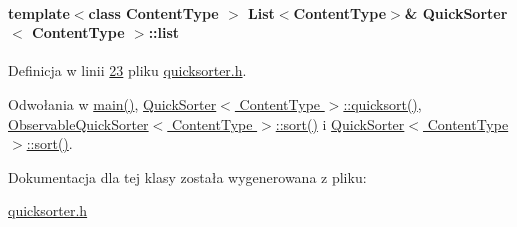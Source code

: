 \hypertarget{class_quick_sorter_a66cd768b6d8a77952f004be7aad87a0e}{
\paragraph[{list}]{\setlength{\rightskip}{0pt plus 5cm}template$<$class Content\-Type $>$ {\bf List}$<$Content\-Type$>$\& {\bf Quick\-Sorter}$<$ Content\-Type $>$\-::list}}\label{class_quick_sorter_a66cd768b6d8a77952f004be7aad87a0e}


Definicja w linii \hyperlink{quicksorter_8h_source_l00023}{23} pliku \hyperlink{quicksorter_8h_source}{quicksorter.\-h}.



Odwołania w \hyperlink{main_8cpp_source_l00022}{main()}, \hyperlink{quicksorter_8h_source_l00042}{Quick\-Sorter$<$ Content\-Type $>$\-::quicksort()}, \hyperlink{observablequicksorter_8h_source_l00026}{Observable\-Quick\-Sorter$<$ Content\-Type $>$\-::sort()} i \hyperlink{quicksorter_8h_source_l00067}{Quick\-Sorter$<$ Content\-Type $>$\-::sort()}.



Dokumentacja dla tej klasy została wygenerowana z pliku\-:\begin{DoxyCompactItemize}
\item 
\hyperlink{quicksorter_8h}{quicksorter.\-h}\end{DoxyCompactItemize}
